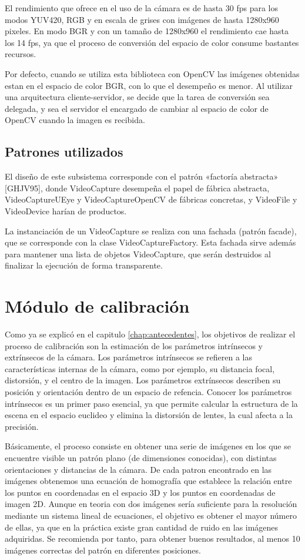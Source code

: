 El rendimiento que ofrece en el uso de la cámara es de hasta 30 fps para los modos YUV420, RGB y en escala de grises con imágenes de hasta 1280x960 pixeles. En modo BGR y con un tamaño de 1280x960 el rendimiento cae hasta los 14 fps, ya que el proceso de conversión del espacio de color consume bastantes recursos. 

Por defecto, cuando se utiliza esta biblioteca con OpenCV las imágenes obtenidas estan en el espacio de color BGR, con lo que el desempeño es menor. Al utilizar una arquitectura cliente-servidor, se decide que la tarea de conversión sea delegada, y sea el servidor el encargado de cambiar al espacio de color de OpenCV cuando la imagen es recibida.

\subsection{Patrones utilizados}
El diseño de este subsistema corresponde con el patrón «factoría abstracta» [GHJV95], donde VideoCapture desempeña el papel de fábrica abstracta, VideoCaptureUEye y VideoCaptureOpenCV de fábricas concretas, y VideoFile y VideoDevice harían de productos.


La instanciación de un VideoCapture se realiza con una fachada (patrón facade), que se corresponde con la clase VideoCaptureFactory. Esta fachada sirve además para mantener una lista de objetos VideoCapture, que serán destruidos al finalizar la ejecución de forma transparente.


\section{Módulo de calibración}
Como ya se explicó en el capitulo \ref{chap:antecedentes}, los objetivos de realizar el proceso de calibración son la estimación de los parámetros intrínsecos y extrínsecos de la cámara. Los parámetros intrínsecos se refieren a las características internas de la cámara, como por ejemplo, su distancia focal, distorsión, y el centro de la imagen. Los parámetros extrínsecos describen su posición y orientación dentro de un espacio de refencia. Conocer los parámetros intrínsecos es un primer paso esencial, ya que permite calcular la estructura de la escena en el espacio euclideo y elimina la distorsión de lentes, la cual afecta a la precisión.

Básicamente, el proceso consiste en obtener una serie de imágenes en los que se encuentre visible un patrón plano (de dimensiones conocidas), con distintas orientaciones y distancias de la cámara. De cada patron encontrado en las imágenes obtenemos una ecuación de homografía que establece la relación entre los puntos en coordenadas en el espacio 3D y los puntos en coordenadas de imagen 2D. Aunque en teoria con dos imágenes sería suficiente para la resolución mediante un sistema lineal de ecuaciones, el objetivo es obtener el mayor número de ellas, ya que en la práctica existe gran cantidad de ruido en las imágenes adquiridas. Se recomienda por tanto, para obtener buenos resultados, al menos 10 imágenes correctas del patrón en diferentes posiciones.

